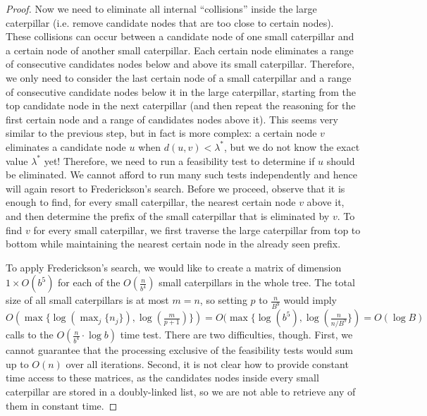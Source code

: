 \documentclass[a4paper,UKenglish]{lipics-v2016}
\theoremstyle{plain}
\begin{document}
\begin{proof}
Now we need to eliminate all internal ``collisions'' inside the large caterpillar (i.e. remove candidate nodes that
are too close to certain nodes). These collisions can occur between a candidate node of one small caterpillar
and a certain node of another small caterpillar. Each certain node eliminates a range of consecutive
candidates nodes below and above its small caterpillar. Therefore, we only need to consider the 
last certain node of a small caterpillar and a range of consecutive candidate nodes below it in the
large caterpillar, starting from the top candidate node in the next caterpillar (and then repeat
the reasoning for the first certain node and a range of candidates nodes above it). This seems very similar
to the previous step, but in fact is more complex: a certain node $v$ eliminates a candidate node $u$ when
$d(u,v)<\lambda^{*}$, but we do not know the exact value $\lambda^{*}$ yet! Therefore, we need to run
a feasibility test to determine if $u$ should be eliminated. We cannot afford to run many such tests
independently and hence will again resort to Frederickson's search. Before we proceed, observe that
it is enough to find, for every small caterpillar, the nearest certain node $v$ above it, and then determine
the prefix of the small caterpillar that is eliminated by $v$. To find $v$ for every small caterpillar,
we first traverse the large caterpillar from top to bottom while maintaining the nearest certain node
in the already seen prefix.

To apply Frederickson's search, we would like to create a matrix of dimension $1\times O(b^{5})$
for each of the $O(\frac{n}{b^{4}})$ small caterpillars in the whole tree. The total size of all small
caterpillars is at most $m=n$, so setting $p$ to $\frac{n}{B^9}$ would imply
$O(\max \lbrace \log(\max_{j} \lbrace n_j \rbrace), \log(\frac{m}{p+1}) \rbrace) = O(\max \lbrace \log (b^{5}), \log(\frac{n}{n/B^{9}} \rbrace) = O(\log B)$ calls to the $O(\frac{n}{b^{4}} \cdot \log b)$ time test.
There are two difficulties, though. First, we cannot guarantee that the processing exclusive of the feasibility tests
would sum up to $O(n)$ over all iterations. Second, it is not clear how to provide constant time access
to these matrices, as the candidates nodes inside every small caterpillar are stored in a doubly-linked list,
so we are not able to retrieve any of them in constant time. 


\end{proof}
\end{document}
